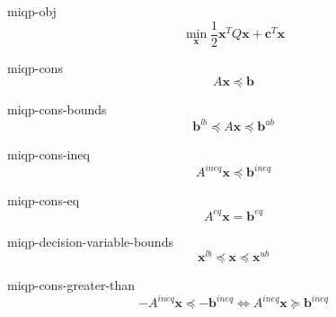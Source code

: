 \EQUATION miqp-obj
\begin{equation}
  \label{eq:miqp-obj}
  \min_{\mathbf{x}} \frac{1}{2} \mathbf{x}^{T}Q\mathbf{x}+\mathbf{c}^{T}\mathbf{x}
\end{equation}
\ENDEQUATION
 
\bigskip %

\EQUATION miqp-cons
\begin{equation}
  \label{eq:miqp-cons}
  A\mathbf{x} \preceq \mathbf{b}
\end{equation}
\ENDEQUATION

\bigskip %

\EQUATION miqp-cons-bounds
\begin{equation}
  \label{eq:miqp-cons-bounds}
  \mathbf{b}^{lb} \preceq A\mathbf{x} \preceq \mathbf{b}^{ub}
\end{equation}
\ENDEQUATION

\bigskip %

\EQUATION miqp-cons-ineq
\begin{equation}
  \label{eq:miqp-cons-ineq}
  A^{ineq}\mathbf{x} \preceq \mathbf{b}^{ineq}
\end{equation}
\ENDEQUATION

\bigskip %

\EQUATION miqp-cons-eq
\begin{equation}
  \label{eq:miqp-cons-eq}
  A^{eq}\mathbf{x} = \mathbf{b}^{eq}
\end{equation}
\ENDEQUATION

\bigskip %

\EQUATION miqp-decision-variable-bounds
\begin{equation}
  \label{eq:miqp-decision-variable-bounds}
  \mathbf{x}^{lb} \preceq \mathbf{x} \preceq \mathbf{x}^{ub}
\end{equation}
\ENDEQUATION

\bigskip %

\EQUATION miqp-cons-greater-than
\begin{equation}
  \label{eq:miqp-cons-greater-than}
  -A^{ineq}\mathbf{x} \preceq -\mathbf{b}^{ineq} \Leftrightarrow A^{ineq}\mathbf{x} \succeq \mathbf{b}^{ineq}
\end{equation}
\ENDEQUATION

\bigskip %

